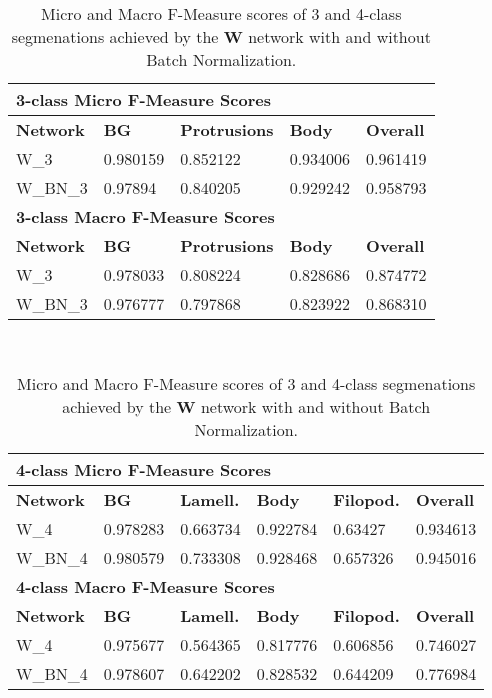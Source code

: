 \begin {table}
	\begin{flushleft}
		\begin {tabular}[!htb]{|l|l|l|l|l|}
			\hline\multicolumn{5}{|l|}{\textbf{3-class Micro F-Measure Scores}} \\ \hline
			\textbf{Network}& \textbf{BG}& \textbf{Protrusions}& \textbf{Body}& \textbf{Overall} \\ \hline
			W\_3& \cellcolor{green!25}0.980159& \cellcolor{green!25}0.852122& \cellcolor{green!25}0.934006& \cellcolor{green!25}0.961419 \\ \hline
			W\_BN\_3& 0.97894& 0.840205& 0.929242& 0.958793 \\ \hline
			\multicolumn{5}{|l|}{\textbf{3-class Macro F-Measure Scores}} \\ \hline
			\textbf{Network}& \textbf{BG}& \textbf{Protrusions}& \textbf{Body}& \textbf{Overall} \\ \hline
			W\_3& \cellcolor{green!25}0.978033& \cellcolor{green!25}0.808224& \cellcolor{green!25}0.828686& \cellcolor{green!25}0.874772 \\ \hline
			W\_BN\_3& 0.976777& 0.797868& 0.823922& 0.868310 \\ \hline
		\end {tabular}
		\vspace{0.5cm}\\
		\begin {tabular}[!htb]{|l|l|l|l|l|l|}
			\hline\multicolumn{6}{|l|}{\textbf{4-class Micro F-Measure Scores}} \\ \hline
			\textbf{Network}& \textbf{BG}& \textbf{Lamell.}& \textbf{Body}& \textbf{Filopod.}& \textbf{Overall} \\ \hline
			W\_4& 0.978283& 0.663734& 0.922784& 0.63427& 0.934613 \\ \hline
			W\_BN\_4& \cellcolor{green!25}0.980579& \cellcolor{green!25}0.733308& \cellcolor{green!25}0.928468& \cellcolor{green!25}0.657326& \cellcolor{green!25}0.945016 \\ \hline
			\multicolumn{6}{|l|}{\textbf{4-class Macro F-Measure Scores}} \\ \hline
			\textbf{Network}& \textbf{BG}& \textbf{Lamell.}& \textbf{Body}& \textbf{Filopod.}& \textbf{Overall} \\ \hline
			W\_4& 0.975677& 0.564365& 0.817776& 0.606856& 0.746027 \\ \hline
			W\_BN\_4& \cellcolor{green!25}0.978607& \cellcolor{green!25}0.642202& \cellcolor{green!25}0.828532& \cellcolor{green!25}0.644209& \cellcolor{green!25}0.776984 \\ \hline
		\end {tabular}
	\end {flushleft}

\caption[Micro and Macro F-Measure scores for a network with and without Batch Normalization.]{Micro and Macro F-Measure scores of 3 and 4-class segmenations achieved by the \textbf{W} network with and without Batch Normalization.}
\label{tab:results2}
\end {table}


